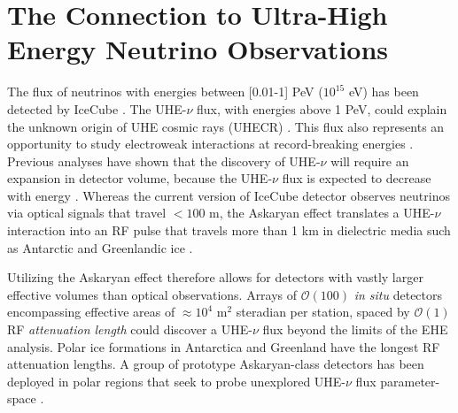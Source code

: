 \documentclass[../../main.tex]{subfiles}
\begin{document}
\section{The Connection to Ultra-High Energy Neutrino Observations}
\label{sec:askaryan}

The flux of neutrinos with energies between [0.01-1] PeV ($10^{15}$ eV) has been detected by IceCube \cite{10.1126/science.1242856}.  The UHE-$\nu$ flux, with energies above 1 PeV, could explain the unknown origin of UHE cosmic rays (UHECR) \cite{Ackermann:201946d}.  This flux also represents an opportunity to study electroweak interactions at record-breaking energies \cite{Ackermann:20195ec}.  Previous analyses have shown that the discovery of UHE-$\nu$ will require an expansion in detector volume, because the UHE-$\nu$ flux is expected to decrease with energy \cite{10.1016/j.astropartphys.2010.06.003,10.1088/1475-7516/2010/10/013,10.1103/physrevd.98.062003,10.1088/1475-7516/2020/03/053,10.1103/physrevd.102.043021}.  Whereas the current version of IceCube detector observes neutrinos via optical signals that travel $<100$ m, the Askaryan effect translates a UHE-$\nu$ interaction into an RF pulse that travels more than 1 km in dielectric media such as Antarctic and Greenlandic ice \cite{askaryan1,zhs,10.3189/2015jog14j214, 10.3189/2015jog15j057, 10.1016/j.astropartphys.2011.11.010}. \\ \vspace{2.5mm}

Utilizing the Askaryan effect therefore allows for detectors with vastly larger effective volumes than optical observations.  Arrays of $\mathcal{O}(100)$ \textit{in situ} detectors encompassing effective areas of $\approx 10^4$ m$^2$ steradian per station, spaced by $\mathcal{O}(1)$ RF \textit{attenuation length} could discover a UHE-$\nu$ flux beyond the limits of the EHE analysis.  Polar ice formations in Antarctica and Greenland have the longest RF attenuation lengths.  A group of prototype Askaryan-class detectors has been deployed in polar regions that seek to probe unexplored UHE-$\nu$ flux parameter-space \cite{rice,10.1088/1475-7516/2020/03/053,10.1103/physrevd.102.043021,10.1103/physrevd.99.122001}. \\ \vspace{2.5mm}
\end{document}
